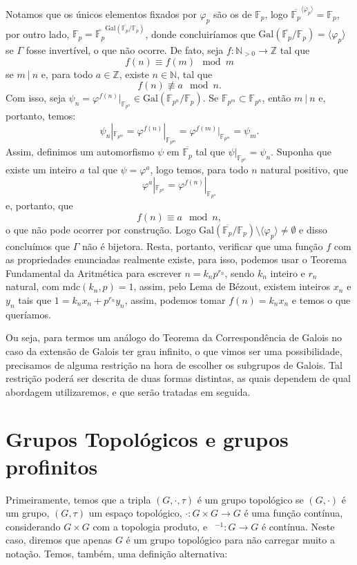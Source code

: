 \documentclass[12pt,a4paper]{article}
\theoremstyle{definition}
\begin{document}
Notamos que os únicos elementos fixados por $\varphi_p$ são os de $\mathbb{F}_p$, logo $\overline{\mathbb{F}_p}^{\langle \varphi_p \rangle} = \mathbb{F}_p$, por outro lado, $ \mathbb{F}_p=\overline{\mathbb{F}_p}^{\text{Gal}(\overline{\mathbb{F}_p}/\mathbb{F}_p)}$, donde concluiríamos que $ \text{Gal}(\overline{\mathbb{F}_p}/\mathbb{F}_p)=\langle \varphi_p \rangle$ se $\Gamma$ fosse invertível, o que não ocorre. De fato, seja $f:\mathbb{N}_{>0}\rightarrow \mathbb{Z}$ tal que $$f(n)\equiv f(m) \mod m$$ se $m \ | \ n$ e, para todo $a\in \mathbb{Z}$, existe $n\in \mathbb{N}$, tal que $$f(n)\not\equiv a \mod n.$$ Com isso, seja $\psi_n=\varphi^{f(n)}|_{\mathbb{F}_{p^n}}\in \text{Gal}(\mathbb{F}_{p^n}/\mathbb{F}_p)$. Se $\mathbb{F}_{p^m} \subset \mathbb{F}_{p^n}$, então  $m \ | \ n$ e, portanto, temos: $$\psi_n|_{\mathbb{F}_{p^m}}=\varphi^{f(n)}|_{\mathbb{F}_{p^m}}=\varphi^{f(m)}|_{\mathbb{F}_{p^m}}=\psi_m.$$ Assim, definimos um automorfismo $\psi$ em $\overline{\mathbb{F}_p}$ tal que $\psi|_{\mathbb{F}_{p^n}}=\psi_n$. Suponha que existe um inteiro $a$ tal que $\psi=\varphi^a$, logo temos, para todo $n$ natural positivo, que $$\varphi^{a}|_{\mathbb{F}_{p^n}}=\varphi^{f(n)}|_{\mathbb{F}_{p^n}}$$ e, portanto, que $$f(n)\equiv a \mod n,$$ o que não pode ocorrer por construção. Logo $\text{Gal}(\overline{\mathbb{F}_p}/\mathbb{F}_p) \setminus \langle \varphi_p \rangle \neq \emptyset$ e disso concluímos que $\Gamma$ não é bijetora. Resta, portanto, verificar que uma função $f$ com as propriedades enunciadas realmente existe, para isso, podemos usar o Teorema Fundamental da Aritmética para escrever $n=k_n p^{r_n}$, sendo $k_n$ inteiro e $r_n$ natural, com $\text{mdc}(k_n,p)=1$, assim, pelo Lema de Bézout, existem inteiros $x_n$ e $y_n$ tais que $1=k_n x_n+p^{r_n} y_n$, assim, podemos tomar $f(n)=k_n x_n$ e temos o que queríamos.

Ou seja, para termos um análogo do Teorema da Correspondência de Galois no caso da extensão de Galois ter grau infinito, o que vimos ser uma possibilidade, precisamos de alguma restrição na hora de escolher os subgrupos de Galois. Tal restrição poderá ser descrita de duas formas distintas, as quais dependem de qual abordagem utilizaremos, e que serão tratadas em seguida.

\section{Grupos Topológicos e grupos profinitos}

Primeiramente, temos que a tripla $(G, \cdot, \tau)$ é um grupo topológico se $(G, \cdot)$ é um grupo, $(G,\tau)$ um espaço topológico, $\cdot: G\times G \rightarrow G$ é uma função contínua, considerando $G\times G$ com a topologia produto, e $\ \ ^{-1}:G\rightarrow G$ é contínua. Neste caso, diremos que apenas $G$ é um grupo topológico para não carregar muito a notação. Temos, também, uma definição alternativa:
\end{document}
